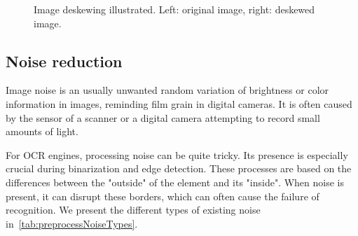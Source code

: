 \begin{figure}
\caption{Image deskewing illustrated. Left: original image, right: deskewed image.}
\label{fig:preprocessDeskewing}
\end{figure}

\subsection{Noise reduction}

Image noise is an usually unwanted random variation of brightness or color information in images, reminding film grain in digital cameras. It is often caused by the sensor of a scanner or a digital camera attempting to record small amounts of light. 

For OCR engines, processing noise can be quite tricky. Its presence is especially crucial during binarization and edge detection. These processes are based on the differences between the "outside" of the element and its "inside". When noise is present, it can disrupt these borders, which can often cause the failure of recognition. We present the different types of existing noise in~\cref{tab:preprocessNoiseTypes}.

